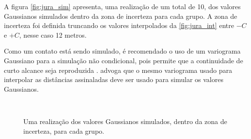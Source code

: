 A figura \autoref{fig:jura_sim} apresenta, uma realização de um total de 10, dos valores Gaussianos simulados dentro da zona de incerteza para cada grupo. A zona de incerteza foi definida truncando os valores interpolados da \autoref{fig:jura_int} entre $ -C $ e $ + C $, nesse caso 12 metros.

Como um contato está sendo simulado, é recomendado o uso de um variograma Gaussiano para a simulação não condicional, pois permite que a continuidade de curto alcance seja reproduzida \cite{wilde2012kriging}.  advoga que o mesmo variograma usado para interpolar as distâncias assinaladas deve ser usado para simular os valores Gaussianos.

\begin{figure}[H]
    \caption{Uma realização dos valores Gaussianos simulados, dentro da zona de incerteza, para cada grupo.} \label{fig:jura_sim}
     \centering
     \hspace{1em}
     \\

\end{figure}
